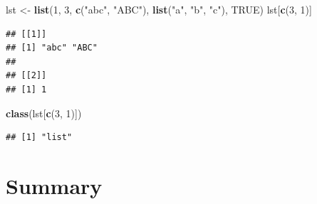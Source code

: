 \documentclass[
]{book}
\newenvironment{Shaded}{\begin{snugshade}}{\end{snugshade}}
\newcommand{\DecValTok}[1]{\textcolor[rgb]{0.00,0.00,0.81}{#1}}
\newcommand{\KeywordTok}[1]{\textcolor[rgb]{0.13,0.29,0.53}{\textbf{#1}}}
\newcommand{\NormalTok}[1]{#1}
\newcommand{\OtherTok}[1]{\textcolor[rgb]{0.56,0.35,0.01}{#1}}
\newcommand{\StringTok}[1]{\textcolor[rgb]{0.31,0.60,0.02}{#1}}
\begin{document}
\begin{Shaded}
\begin{Highlighting}[]
\NormalTok{lst <-}\StringTok{ }\KeywordTok{list}\NormalTok{(}\DecValTok{1}\NormalTok{, }\DecValTok{3}\NormalTok{, }\KeywordTok{c}\NormalTok{(}\StringTok{"abc"}\NormalTok{, }\StringTok{"ABC"}\NormalTok{), }\KeywordTok{list}\NormalTok{(}\StringTok{"a"}\NormalTok{, }\StringTok{"b"}\NormalTok{, }\StringTok{"c"}\NormalTok{), }\OtherTok{TRUE}\NormalTok{)}
\NormalTok{lst[}\KeywordTok{c}\NormalTok{(}\DecValTok{3}\NormalTok{, }\DecValTok{1}\NormalTok{)]}
\end{Highlighting}
\end{Shaded}

\begin{verbatim}
## [[1]]
## [1] "abc" "ABC"
## 
## [[2]]
## [1] 1
\end{verbatim}

\begin{Shaded}
\begin{Highlighting}[]
\KeywordTok{class}\NormalTok{(lst[}\KeywordTok{c}\NormalTok{(}\DecValTok{3}\NormalTok{, }\DecValTok{1}\NormalTok{)])}
\end{Highlighting}
\end{Shaded}

\begin{verbatim}
## [1] "list"
\end{verbatim}

\hypertarget{summary-1}{%
\section*{Summary}\label{summary-1}}
\end{document}
